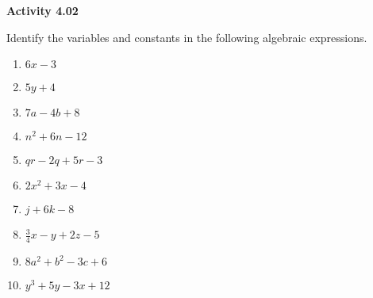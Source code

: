 \vspace{0.3ex}
\noindent\textbf{Activity 4.02}

\vspace{0.2ex}

Identify the variables and constants in the following algebraic expressions.
\begin{multicols}{2}				
\begin{enumerate}
    \item $6x - 3$  
    \item $5y + 4$  
    \item $7a - 4b + 8$  
    \item $n^2 + 6n - 12$  
    \item $qr - 2q + 5r - 3$  
    \item $2x^2 + 3x - 4$  
    \item $j + 6k - 8$  
    \item $\frac{3}{4}x - y + 2z - 5$  
    \item $8a^2 + b^2 - 3c + 6$  
    \item $y^3 + 5y - 3x + 12$  
\end{enumerate}
  
\end{multicols}
